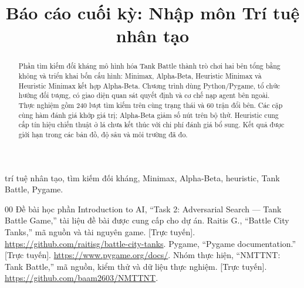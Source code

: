 \documentclass[conference,a4paper]{IEEEtran}
\begin{document}
\title{Báo cáo cuối kỳ: Nhập môn Trí tuệ nhân tạo}
\author{
}
\maketitle

\begin{abstract}
Phần tìm kiếm đối kháng mô hình hóa Tank Battle thành trò chơi hai bên
tổng bằng không và triển khai bốn cấu hình: Minimax, Alpha-Beta,
Heuristic Minimax và Heuristic Minimax kết hợp Alpha-Beta. Chương trình
dùng Python/Pygame, tổ chức hướng đối tượng, có giao diện quan sát
quyết định và cơ chế nạp agent bên ngoài. Thực nghiệm gồm 240 lượt tìm
kiếm trên cùng trạng thái và 60 trận đổi bên. Các cặp cùng hàm đánh giá
khớp giá trị; Alpha-Beta giảm số nút trên bộ thử. Heuristic cung cấp
tín hiệu chiến thuật ở lá chưa kết thúc với chi phí đánh giá bổ sung.
Kết quả được giới hạn trong các bản đồ, độ sâu và môi trường đã đo.
\end{abstract}
\begin{IEEEkeywords}
trí tuệ nhân tạo, tìm kiếm đối kháng, Minimax, Alpha-Beta, heuristic,
Tank Battle, Pygame.
\end{IEEEkeywords}





\balance
\begin{thebibliography}{00}
Đề bài học phần Introduction to AI, ``Task 2: Adversarial Search ---
Tank Battle Game,'' tài liệu đề bài được cung cấp cho dự án.
Raitis G., ``Battle City Tanks,'' mã nguồn và tài nguyên game.
[Trực tuyến]. \url{https://github.com/raitisg/battle-city-tanks}.
Pygame, ``Pygame documentation.''
[Trực tuyến]. \url{https://www.pygame.org/docs/}.
Nhóm thực hiện, ``NMTTNT: Tank Battle,'' mã nguồn, kiểm thử và dữ liệu
thực nghiệm. [Trực tuyến]. \url{https://github.com/baam2603/NMTTNT}.
\end{thebibliography}
\end{document}
